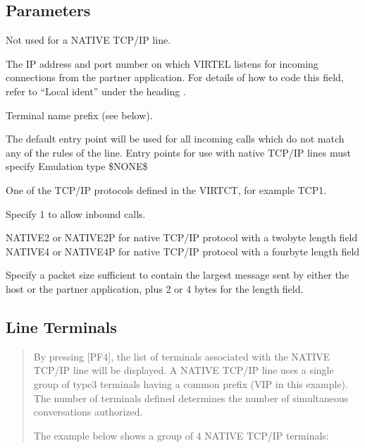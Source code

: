 \documentclass[letterpaper,10pt,english]{sphinxmanual}
\begin{document}
\subsection{Parameters}
\label{\detokenize{connectivity_guide:index-35}}\label{\detokenize{connectivity_guide:id12}}\begin{description}
\sphinxAtStartPar
Not used for a NATIVE TCP/IP line.

\sphinxAtStartPar
The IP address and port number on which VIRTEL listens for incoming connections from the partner application. For details of how to code this field, refer to “Local ident” under the heading .

\sphinxAtStartPar
Terminal name prefix (see below).

\sphinxAtStartPar
The default entry point will be used for all incoming calls which do not match any of the rules of the line. Entry points for use with native TCP/IP lines must specify Emulation type \$NONE\$

\sphinxAtStartPar
One of the TCP/IP protocols defined in the VIRTCT, for example TCP1.

\sphinxAtStartPar
Specify 1 to allow inbound calls.

\sphinxAtStartPar
NATIVE2 or NATIVE2P for native TCP/IP protocol with a two\sphinxhyphen{}byte length field NATIVE4 or NATIVE4P for native TCP/IP protocol with a four\sphinxhyphen{}byte length field

\sphinxAtStartPar
Specify a packet size sufficient to contain the largest message sent by either the host or the partner application, plus 2 or 4 bytes for the length field.

\end{description}

\ignorespaces 

\subsection{Line Terminals}
\label{\detokenize{connectivity_guide:line-terminals}}\label{\detokenize{connectivity_guide:index-36}}\begin{quote}

\sphinxAtStartPar
By pressing {[}PF4{]}, the list of terminals associated with the NATIVE TCP/IP line will be displayed. A NATIVE TCP/IP line uses a single group of type\sphinxhyphen{}3 terminals having a common prefix (VIP in this example). The number of terminals defined determines the number of simultaneous conversations authorized.

\sphinxAtStartPar
The example below shows a group of 4 NATIVE TCP/IP terminals:
\end{quote}
\end{document}
